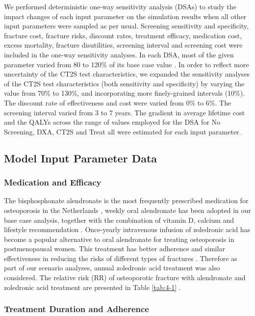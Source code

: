 We performed deterministic one-way sensitivity analysis (DSAs) to study the impact changes of each input parameter on the simulation results when all other input parameters were sampled as per usual. Screening sensitivity and specificity, fracture cost, fracture risks, discount rates, treatment efficacy, medication cost, excess mortality, fracture disutilities, screening interval and screening cost were included in the one-way sensitivity analyses. In each DSA, most of the given parameter varied from 80 to 120\% of its base case value \cite{4-27}. In order to reflect more uncertainty of the CT2S test characteristics, we expanded the sensitivity analyses of the CT2S test characteristics (both sensitivity and specificity) by varying the value from 70\% to 130\%, and incorporating more finely-grained intervals (10\%). The discount rate of effectiveness and cost were varied from 0\% to 6\%. The screening interval varied from 3 to 7 years. The gradient in average lifetime cost and the QALYs across the range of values employed for the DSA for No Screening, DXA, CT2S and Treat all were estimated for each input parameter.

\subsection{Model Input Parameter Data}
\subsubsection{Medication and Efficacy}

The bisphosphonate alendronate is the most frequently prescribed medication for osteoporosis in the Netherlands \cite{4-28}, weekly oral alendronate has been adopted in our base case analysis, together with the combination of vitamin D, calcium and lifestyle recommendation \cite{4-29}. Once-yearly intravenous infusion of zoledronic acid has become a popular alternative to oral alendronate for treating osteoporosis in postmenopausal women. This treatment has better adherence and similar effectiveness in reducing the risks of different types of fractures \cite{4-30,4-31} . Therefore as part of our scenario analyses, annual zoledronic acid treatment was also considered. The relative risk (RR) of osteoporotic fracture with alendronate and zoledronic acid treatment are presented in Table \ref{tab:4-1} \cite{4-31,4-32,4-33}.

\subsubsection{Treatment Duration and Adherence}

